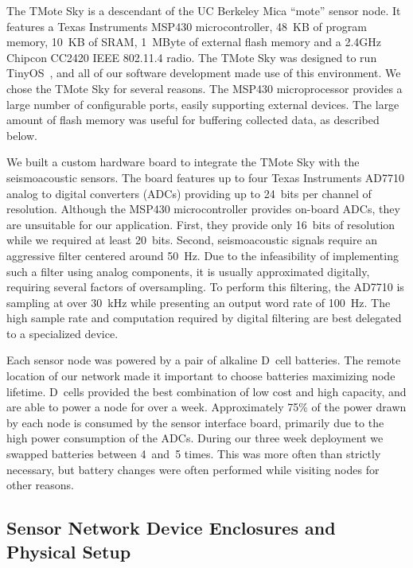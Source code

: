The TMote Sky is a descendant of the UC Berkeley Mica ``mote'' sensor node.
It features a Texas Instruments MSP430 microcontroller, 48~KB of program
memory, 10~KB of SRAM, 1~MByte of external flash memory and a 2.4GHz Chipcon
CC2420 IEEE 802.11.4 radio.  The TMote Sky was designed to run
TinyOS~\cite{tinyos-asplos00}, and all of our software development made use
of this environment.  We chose the TMote Sky for several reasons.  The MSP430
microprocessor provides a large number of configurable ports, easily
supporting external devices.  The large amount of flash memory was useful for
buffering collected data, as described below.

We built a custom hardware board to integrate the TMote Sky with the
seismoacoustic sensors.  The board features up to four Texas Instruments
AD7710 analog to digital converters (ADCs) providing up to 24~bits per
channel of resolution.  Although the MSP430 microcontroller provides on-board
ADCs, they are unsuitable for our application.  First, they provide only
16~bits of resolution while we required at least 20~bits.  Second,
seismoacoustic signals require an aggressive filter centered around 50~Hz.
Due to the infeasibility of implementing such a filter using analog
components, it is usually approximated digitally, requiring several factors
of oversampling.  To perform this filtering, the AD7710 is sampling at over
30~kHz while presenting an output word rate of 100~Hz.  The high sample rate
and computation required by digital filtering are best delegated to a
specialized device.

Each sensor node was powered by a pair of alkaline D~cell batteries.  The
remote location of our network made it important to choose batteries
maximizing node lifetime.  D~cells provided the best combination of low cost
and high capacity, and are able to power a node for over a week.
Approximately 75\% of the power drawn by each node is consumed by the sensor
interface board, primarily due to the high power consumption of the ADCs.
During our three week deployment we swapped batteries between 4~and~5 times.
This was more often than strictly necessary, but battery changes were often
performed while visiting nodes for other reasons.

\subsection{Sensor Network Device Enclosures and Physical Setup}

